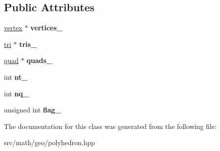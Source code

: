 \subsection*{Public Attributes}
\begin{DoxyCompactItemize}
\item 
\hypertarget{classmath_1_1geo_1_1polyhedron_a95b429bd2b0b049560fc008563663b17}{
\hyperlink{classmath_1_1geo_1_1vertex}{vertex} $\ast$ {\bfseries vertices\_\-}}
\label{classmath_1_1geo_1_1polyhedron_a95b429bd2b0b049560fc008563663b17}

\item 
\hypertarget{classmath_1_1geo_1_1polyhedron_a1f3a59fa6add8c59eea9deea460c3c96}{
\hyperlink{classmath_1_1geo_1_1tri}{tri} $\ast$ {\bfseries tris\_\-}}
\label{classmath_1_1geo_1_1polyhedron_a1f3a59fa6add8c59eea9deea460c3c96}

\item 
\hypertarget{classmath_1_1geo_1_1polyhedron_aece41abb7f5005d9ff6de2016aae790c}{
\hyperlink{classmath_1_1geo_1_1quad}{quad} $\ast$ {\bfseries quads\_\-}}
\label{classmath_1_1geo_1_1polyhedron_aece41abb7f5005d9ff6de2016aae790c}

\item 
\hypertarget{classmath_1_1geo_1_1polyhedron_ab8bbfdd91290c53d8f8e0c55c3f11fdd}{
int {\bfseries nt\_\-}}
\label{classmath_1_1geo_1_1polyhedron_ab8bbfdd91290c53d8f8e0c55c3f11fdd}

\item 
\hypertarget{classmath_1_1geo_1_1polyhedron_ac5bbb1b818226c30b4f8ea39006efa57}{
int {\bfseries nq\_\-}}
\label{classmath_1_1geo_1_1polyhedron_ac5bbb1b818226c30b4f8ea39006efa57}

\item 
\hypertarget{classmath_1_1geo_1_1polyhedron_a962cdc8309c56bd40a34c3af223d6fd3}{
unsigned int {\bfseries flag\_\-}}
\label{classmath_1_1geo_1_1polyhedron_a962cdc8309c56bd40a34c3af223d6fd3}

\end{DoxyCompactItemize}


The documentation for this class was generated from the following file:\begin{DoxyCompactItemize}
\item 
src/math/geo/polyhedron.hpp\end{DoxyCompactItemize}
